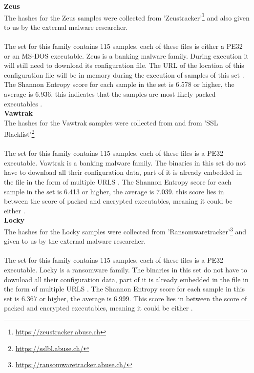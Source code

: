 \documentclass[conference]{IEEEtran}
\begin{document}
\textbf{Zeus}\\
The hashes for the Zeus samples were collected from 'Zeustracker'\footnote{\url{https://zeustracker.abuse.ch}} and also given to us by the external malware researcher. \\\\The set for this family contains 115 samples, each of these files is either a PE32 or an MS-DOS executable. Zeus is a banking malware family. During execution it will still need to download its configuration file. The URL of the location of this configuration file will be in memory during the execution of samples of this set \cite{wyke-zeus}. The Shannon Entropy score for each sample in the set is 6.578 or higher, the average is 6.936. this indicates that the samples are most likely packed executables \cite{hamrock-entropy}.\\

\textbf{Vawtrak}\\
The hashes for the Vawtrak samples were collected from \cite{sahin-vawtrak} and from 'SSL Blacklist'\footnote{\url{https://sslbl.abuse.ch/}}
\\\\The set for this family contains 115 samples, each of these files is a PE32 executable. Vawtrak is a banking malware family. The binaries in this set do not have to download all their \Gls{configuration data}, part of it is already embedded in the file in the form of  multiple URLS \cite{kroustek-vawtrak}. The Shannon Entropy score for each sample in the set is 6.413 or higher, the average is 7.039. this score lies in between the score of packed and encrypted executables, meaning it could be either \cite{hamrock-entropy}.\\


\textbf{Locky}\\
The hashes for the Locky samples were collected from 'Ransomwaretracker'\footnote{\url{https://ransomwaretracker.abuse.ch/}}  and given to us by the external malware researcher.\\\\The set for this family contains 115 samples, each of these files is a PE32 executable. Locky is a ransomware family. The binaries in this set do not have to download all their \Gls{configuration data}, part of it is already embedded in the file in the form of  multiple URLS \cite{nelson-locky}. The Shannon Entropy score for each sample in this set is 6.367 or higher, the average is 6.999. This score lies in between the score of packed and encrypted executables, meaning it could be either \cite{hamrock-entropy}.\\
\end{document}
